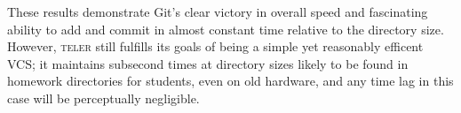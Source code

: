 \documentclass[12pt, letterpaper]{article}
\begin{document}
\begin{multicols}{2}
These results demonstrate Git's clear victory in overall speed and fascinating
ability to add and commit in almost constant time relative to the directory
size. However, \textsc{teler} still fulfills its goals of being a simple yet
reasonably efficent VCS; it maintains subsecond times at directory sizes likely
to be found in homework directories for students, even on old hardware, and any
time lag in this case will be perceptually negligible.

\end{multicols}
\end{document}
